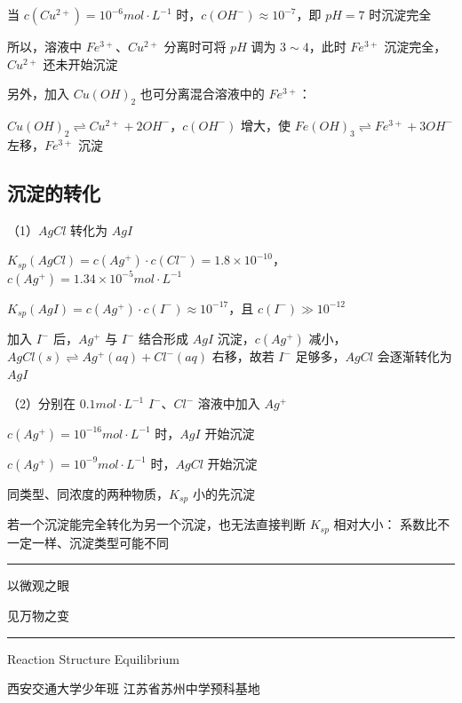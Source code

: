 \documentclass[UTF8,zihao=-4,openany]{ctexbook}
\begin{document}
当 $c(Cu^{2+})=10^{-6}mol\cdot L^{-1}$ 时，$c(OH^-)\approx10^{-7}$，即 $pH=7$ 时沉淀完全\par

所以，溶液中 $Fe^{3+}$、$Cu^{2+}$ 分离时可将 $pH$ 调为 $3\sim4$，此时 $Fe^{3+}$ 沉淀完全，$Cu^{2+}$ 还未开始沉淀\par

另外，加入 $Cu(OH)_2$ 也可分离混合溶液中的 $Fe^{3+}$：\par

$Cu(OH)_2\rightleftharpoons Cu^{2+}+2OH^-$，$c(OH^-)$ 增大，使 $Fe(OH)_3\rightleftharpoons Fe^{3+}+3OH^-$ 左移，$Fe^{3+}$ 沉淀\par
\subsection{沉淀的转化}
（1）$AgCl$ 转化为 $AgI$\par

$K_{sp}(AgCl)=c(Ag^+)\cdot c(Cl^-)=1.8\times10^{-10}$，$c(Ag^+)=1.34\times10^{-5}mol\cdot L^{-1}$\par

$K_{sp}(AgI)=c(Ag^+)\cdot c(I^-)\approx10^{-17}$，且 $c(I^-)\gg10^{-12}$\par

加入 $I^-$ 后，$Ag^+$ 与 $I^-$ 结合形成 $AgI$ 沉淀，$c(Ag^+)$ 减小，$AgCl(s)\rightleftharpoons Ag^+(aq)+Cl^-(aq)$ 右移，故若 $I^-$ 足够多，$AgCl$ 会逐渐转化为 $AgI$\par

（2）分别在 $0.1mol\cdot L^{-1}$ $I^-$、$Cl^-$ 溶液中加入 $Ag^+$\par

$c(Ag^+)=10^{-16}mol\cdot L^{-1}$ 时，$AgI$ 开始沉淀\par

$c(Ag^+)=10^{-9}mol\cdot L^{-1}$ 时，$AgCl$ 开始沉淀\par

同类型、同浓度的两种物质，$K_{sp}$ 小的先沉淀\par

若一个沉淀能完全转化为另一个沉淀，也无法直接判断 $K_{sp}$ 相对大小： 系数比不一定一样、沉淀类型可能不同\par


\backmatter
\cleardoublepage
\thispagestyle{empty}
\begin{titlepage}
\centering
\vspace*{2.0cm}
\rule{0.58\linewidth}{0.8pt}\par
\vspace{1.0cm}
{\songti 以微观之眼\par}
\vspace{0.35cm}
{\songti 见万物之变\par}
\vspace{1.0cm}
\rule{0.58\linewidth}{0.8pt}\par
\vfill
{\rmfamily Reaction \quad Structure \quad Equilibrium\par}
\vspace{0.45cm}
{ 西安交通大学少年班 \quad 江苏省苏州中学预科基地\par}
\vspace*{1.3cm}
\end{titlepage}
\end{document}
